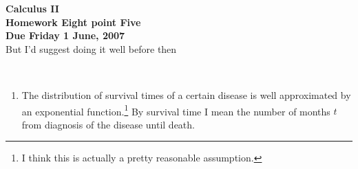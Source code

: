 \documentclass[12pt]{article}
\begin{document}
\pagestyle{empty}
 
\begin{center}
{\large {\bf Calculus II}}\\
\medskip
{\large {\bf Homework Eight point Five}}\\
\medskip
{ {\bf Due Friday 1 June, 2007}}\\
\medskip
But I'd suggest doing it well before then\\
\end{center}

\hspace{2mm}\\


\begin{enumerate}

\item The distribution of survival times of a certain disease is well
  approximated by an exponential function.\footnote{I think this is
  actually a pretty reasonable assumption.}  By survival time I mean
  the number of months $t$ from diagnosis of the disease until death.


\end{enumerate}
\end{document}
